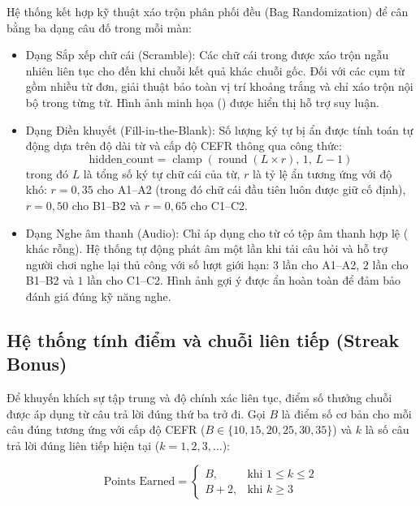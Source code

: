 Hệ thống kết hợp kỹ thuật xáo trộn phân phối đều (Bag Randomization) để cân bằng ba dạng câu đố trong mỗi màn:
\begin{itemize}
    \item Dạng Sắp xếp chữ cái (Scramble): Các chữ cái trong  được xáo trộn ngẫu nhiên liên tục cho đến khi chuỗi kết quả khác chuỗi gốc. Đối với các cụm từ gồm nhiều từ đơn, giải thuật bảo toàn vị trí khoảng trắng và chỉ xáo trộn nội bộ trong từng từ. Hình ảnh minh họa () được hiển thị hỗ trợ suy luận.
    \item Dạng Điền khuyết (Fill-in-the-Blank): Số lượng ký tự bị ẩn được tính toán tự động dựa trên độ dài từ và cấp độ CEFR thông qua công thức:
    \begin{equation}
    \label{eq:hidden_count}
    \text{hidden\_count} = \operatorname{clamp}\left(\operatorname{round}(L \times r),\, 1,\, L - 1\right)
    \end{equation}
    trong đó $L$ là tổng số ký tự chữ cái của từ, $r$ là tỷ lệ ẩn tương ứng với độ khó: $r = 0{,}35$ cho A1--A2 (trong đó chữ cái đầu tiên luôn được giữ cố định), $r = 0{,}50$ cho B1--B2 và $r = 0{,}65$ cho C1--C2.
    \item Dạng Nghe âm thanh (Audio): Chỉ áp dụng cho từ có tệp âm thanh hợp lệ ( khác rỗng). Hệ thống tự động phát âm một lần khi tải câu hỏi và hỗ trợ người chơi nghe lại thủ công với số lượt giới hạn: $3$ lần cho A1--A2, $2$ lần cho B1--B2 và $1$ lần cho C1--C2. Hình ảnh gợi ý được ẩn hoàn toàn để đảm bảo đánh giá đúng kỹ năng nghe.
\end{itemize}

\subsection{Hệ thống tính điểm và chuỗi liên tiếp (Streak Bonus)}
\label{subsec:scoring_and_streak}

Để khuyến khích sự tập trung và độ chính xác liên tục, điểm số thưởng chuỗi được áp dụng từ câu trả lời đúng thứ ba trở đi. Gọi $B$ là điểm số cơ bản cho mỗi câu đúng tương ứng với cấp độ CEFR ($B \in \{10, 15, 20, 25, 30, 35\}$) và $k$ là số câu trả lời đúng liên tiếp hiện tại ($k = 1, 2, 3, \dots$):

\begin{equation}
\label{eq:score}
\text{Points Earned} = \begin{cases}
B, & \text{khi } 1 \le k \le 2 \\
B + 2, & \text{khi } k \ge 3
\end{cases}
\end{equation}

